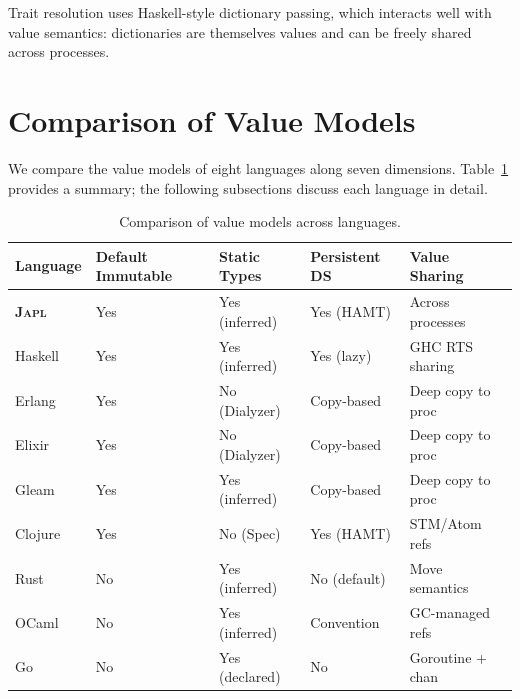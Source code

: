 \documentclass[11pt]{article}
\theoremstyle{definition}
\theoremstyle{remark}
\newcommand{\japl}{\textsc{Japl}}
\begin{document}
Trait resolution uses Haskell-style dictionary passing, which interacts
well with value semantics: dictionaries are themselves values and can
be freely shared across processes.


\section{Comparison of Value Models}
\label{sec:comparison}

We compare the value models of eight languages along seven dimensions.
Table~\ref{tab:comparison} provides a summary; the following
subsections discuss each language in detail.

\begin{table}[H]
\centering
\small
\caption{Comparison of value models across languages.}
\label{tab:comparison}
\begin{tabularx}{\textwidth}{l *{4}{>{\centering\arraybackslash}X}}
\toprule
\textbf{Language} & \textbf{Default Immutable} & \textbf{Static Types}
  & \textbf{Persistent DS} & \textbf{Value Sharing} \\
\midrule
\textbf{\japl{}}  & Yes & Yes (inferred) & Yes (HAMT) & Across processes \\
Haskell           & Yes & Yes (inferred) & Yes (lazy)  & GHC RTS sharing \\
Erlang            & Yes & No (Dialyzer)  & Copy-based  & Deep copy to proc \\
Elixir            & Yes & No (Dialyzer)  & Copy-based  & Deep copy to proc \\
Gleam             & Yes & Yes (inferred) & Copy-based  & Deep copy to proc \\
Clojure           & Yes & No (Spec)      & Yes (HAMT)  & STM/Atom refs \\
Rust              & No  & Yes (inferred) & No (default)& Move semantics \\
OCaml             & No  & Yes (inferred) & Convention  & GC-managed refs \\
Go                & No  & Yes (declared) & No          & Goroutine + chan \\
\bottomrule
\end{tabularx}
\end{table}
\end{document}
